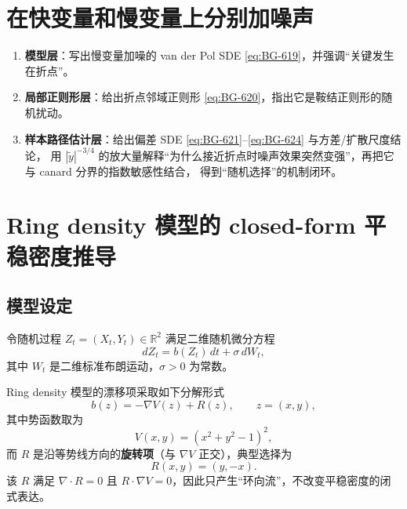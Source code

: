 	\section{在快变量和慢变量上分别加噪声}
	
	
	\begin{enumerate}
		\item \textbf{模型层}：写出慢变量加噪的 van der Pol SDE \eqref{eq:BG-619}，并强调“关键发生在折点”。%
		\item \textbf{局部正则形层}：给出折点邻域正则形 \eqref{eq:BG-620}，指出它是鞍结正则形的随机扰动。%
		\item \textbf{样本路径估计层}：给出偏差 SDE \eqref{eq:BG-621}--\eqref{eq:BG-624} 与方差/扩散尺度结论，
		用 $|\tilde y|^{-3/4}$ 的放大量解释“为什么接近折点时噪声效果突然变强”，再把它与 canard 分界的指数敏感性结合，
		得到“随机选择”的机制闭环。%
	\end{enumerate}
	
	
	\section{Ring density 模型的 closed-form 平稳密度推导}
	
	\subsection{模型设定}
	
	令随机过程 $Z_t=(X_t,Y_t)\in\mathbb{R}^2$ 满足二维随机微分方程
	\begin{equation}\label{eq:ring_sde}
		dZ_t=b(Z_t)\,dt+\sigma\,dW_t,
	\end{equation}
	其中 $W_t$ 是二维标准布朗运动，$\sigma>0$ 为常数。
	
	Ring density 模型的漂移项采取如下分解形式
	\begin{equation}\label{eq:drift_decomp}
		b(z)=-\nabla V(z)+R(z),\qquad z=(x,y),
	\end{equation}
	其中势函数取为
	\begin{equation}\label{eq:potential}
		V(x,y)=(x^2+y^2-1)^2,
	\end{equation}
	而 $R$ 是沿等势线方向的\textbf{旋转项}（与 $\nabla V$ 正交），典型选择为
	\begin{equation}\label{eq:rotation}
		R(x,y)=(y,-x).
	\end{equation}
	该 $R$ 满足 $\nabla\cdot R=0$ 且 $R\cdot \nabla V=0$，因此只产生``环向流''，不改变平稳密度的闭式表达。
	
